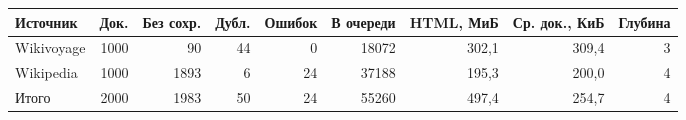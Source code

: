 \begin{tabular}{|l|r|r|r|r|r|r|r|r|}
\hline
Источник & Док. & Без сохр. & Дубл. & Ошибок & В очереди & HTML, МиБ & Ср. док., КиБ & Глубина \\
\hline
Wikivoyage & 1000 & 90 & 44 & 0 & 18072 & 302,1 & 309,4 & 3 \\
\hline
Wikipedia & 1000 & 1893 & 6 & 24 & 37188 & 195,3 & 200,0 & 4 \\
\hline
Итого & 2000 & 1983 & 50 & 24 & 55260 & 497,4 & 254,7 & 4 \\
\hline
\end{tabular}
